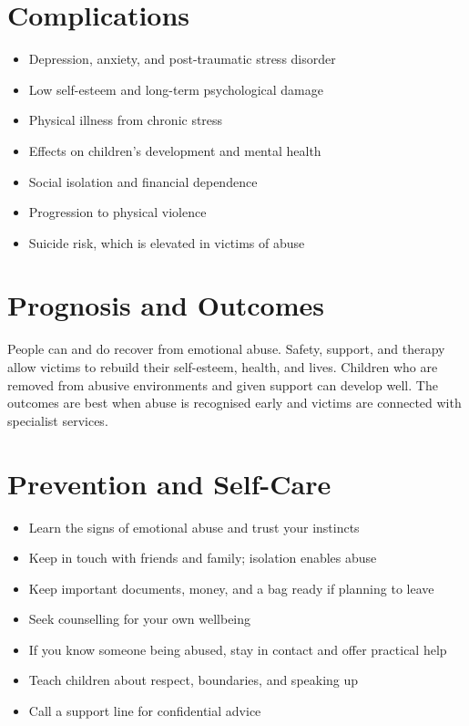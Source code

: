 \section*{Complications}
\begin{itemize}
    \item Depression, anxiety, and post-traumatic stress disorder
    \item Low self-esteem and long-term psychological damage
    \item Physical illness from chronic stress
    \item Effects on children's development and mental health
    \item Social isolation and financial dependence
    \item Progression to physical violence
    \item Suicide risk, which is elevated in victims of abuse
\end{itemize}

\section*{Prognosis and Outcomes}
People can and do recover from emotional abuse. Safety, support, and therapy allow victims to rebuild their self-esteem, health, and lives. Children who are removed from abusive environments and given support can develop well. The outcomes are best when abuse is recognised early and victims are connected with specialist services.

\section*{Prevention and Self-Care}
\begin{itemize}
    \item Learn the signs of emotional abuse and trust your instincts
    \item Keep in touch with friends and family; isolation enables abuse
    \item Keep important documents, money, and a bag ready if planning to leave
    \item Seek counselling for your own wellbeing
    \item If you know someone being abused, stay in contact and offer practical help
    \item Teach children about respect, boundaries, and speaking up
    \item Call a support line for confidential advice
\end{itemize}


